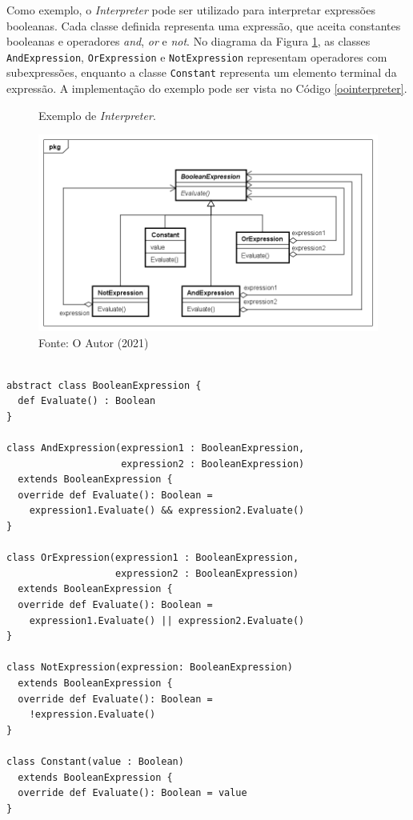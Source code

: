 Como exemplo, o \textit{Interpreter} pode ser utilizado para 
interpretar expressões booleanas. Cada classe definida 
representa uma expressão, que aceita constantes  
booleanas e operadores \textit{and}, \textit{or} e 
\textit{not}. No diagrama da Figura \ref{interpreter_exemplo}, 
as classes \texttt{AndExpression}, \texttt{OrExpression} e 
\texttt{NotExpression} representam operadores com subexpressões, 
enquanto a classe \texttt{Constant} representa um elemento 
terminal da expressão. A implementação do exemplo 
pode ser vista no Código \ref{oointerpreter}.

\begin{figure}[htb]
	\caption{\label{interpreter_exemplo}Exemplo de \textit{Interpreter}.}
	\begin{center}
	    \includegraphics[scale=0.5]{5_padroes-contexto-funcional/5.3_comportamentais/5.3.03_interpreter/Interpreter_exemplo.png}
	\end{center}
  \caption*{Fonte: O Autor (2021)}
\end{figure}

\begin{lstlisting}[caption={\textit{Interpreter} Orientação a Objetos.},label=oointerpreter]

abstract class BooleanExpression {
  def Evaluate() : Boolean
}

class AndExpression(expression1 : BooleanExpression,
                    expression2 : BooleanExpression)
  extends BooleanExpression {
  override def Evaluate(): Boolean =
    expression1.Evaluate() && expression2.Evaluate()
}

class OrExpression(expression1 : BooleanExpression,
                   expression2 : BooleanExpression)
  extends BooleanExpression {
  override def Evaluate(): Boolean =
    expression1.Evaluate() || expression2.Evaluate()
}

class NotExpression(expression: BooleanExpression)
  extends BooleanExpression {
  override def Evaluate(): Boolean =
    !expression.Evaluate()
}

class Constant(value : Boolean)
  extends BooleanExpression {
  override def Evaluate(): Boolean = value
}
    
\end{lstlisting}

